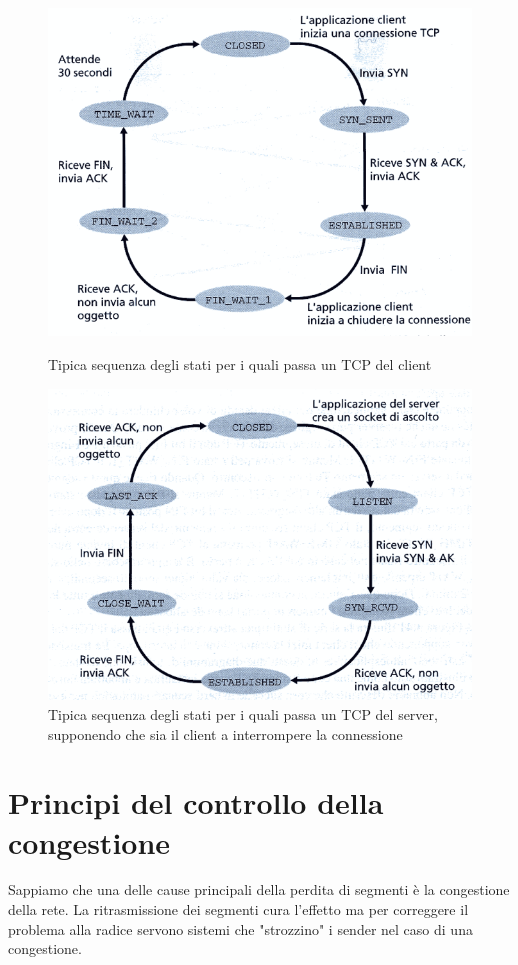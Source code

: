 \documentclass[11pt,a4paper]{book}
\begin{document}
\begin{figure}
	\includegraphics[scale=0.6]{img/037.png}
	\caption{Tipica sequenza degli stati per i quali passa un TCP del client}
	\includegraphics[scale=0.6]{img/038.png}
	\caption{Tipica sequenza degli stati per i quali passa un TCP del server, supponendo che sia il client a interrompere la connessione}
\end{figure}

\section{Principi del controllo della congestione}
Sappiamo che una delle cause principali della perdita di segmenti è la congestione della rete. La ritrasmissione dei segmenti cura l'effetto ma per correggere il problema alla radice servono sistemi che "strozzino" i sender nel caso di una congestione.
\end{document}
